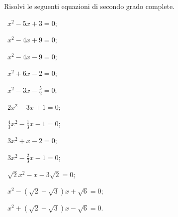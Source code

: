 %

\begin{esercizio}[\Ast]
 \label{ese:3.11}
Risolvi le seguenti equazioni di secondo grado complete.
\begin{multicols}{2}
 \begin{enumeratea}
 \item~$x^{2}-5 x + 3 = 0$;
 \item~$x^{2}-4 x + 9 = 0$;
 \item~$x^{2}-4 x-9 = 0$;
 \item~$x^{2} + 6 x-2 = 0$;
 \item~$x^{2}-3 x-\frac{5}{2} = 0$;
 \item~$2 x^{2}-3 x + 1 = 0$;
 \item~$\frac{4}{3} x^{2}-\frac{1}{3} x-1 = 0$;
 \item~$3 x^{2} + x-2 = 0$;
 \item~$3 x^{2}-\frac{2}{3} x-1 = 0$;
 \item~$\sqrt{2} x^{2}-x-3 \sqrt{2} = 0$;
 \item~$x^{2}-(\sqrt{2} + \sqrt{3}) x + \sqrt{6} = 0$;
 \item~$x^{2} + (\sqrt{2}-\sqrt{3}) x-\sqrt{6} = 0$.
 \end{enumeratea}
 \end{multicols}
\end{esercizio}

